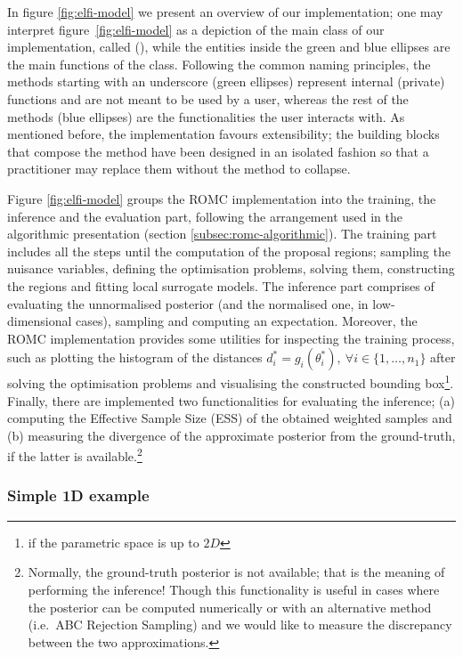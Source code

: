 In figure \ref{fig:elfi-model} we present an overview of our
implementation; one may interpret figure~\ref{fig:elfi-model} as a
depiction of the main class of our implementation, called
(), while the entities inside the green and blue
ellipses are the main functions of the class. Following the common
naming principles, the methods starting with an underscore (green
ellipses) represent internal (private) functions and are not meant to
be used by a user, whereas the rest of the methods (blue ellipses) are
the functionalities the user interacts with. As mentioned before, the
implementation favours extensibility; the building blocks that compose
the method have been designed in an isolated fashion so that a
practitioner may replace them without the method to collapse.

Figure \ref{fig:elfi-model} groups the ROMC implementation into the
training, the inference and the evaluation part, following the
arrangement used in the algorithmic presentation (section
\ref{subsec:romc-algorithmic}). The training part includes all the
steps until the computation of the proposal regions; sampling the
nuisance variables, defining the optimisation problems, solving them,
constructing the regions and fitting local surrogate models. The
inference part comprises of evaluating the unnormalised posterior (and
the normalised one, in low-dimensional cases), sampling and computing
an expectation. Moreover, the ROMC implementation provides some
utilities for inspecting the training process, such as plotting the
histogram of the distances
$d^*_i = g_i(\theta_i^*), \: \forall i \in \{1, \ldots, n_1 \}$ after
solving the optimisation problems and visualising the constructed
bounding box\footnote{if the parametric space is up to $2D$}. Finally,
there are implemented two functionalities for evaluating the
inference; (a) computing the Effective Sample Size (ESS) of the
obtained weighted samples and (b) measuring the divergence of the
approximate posterior from the ground-truth, if the latter is
available.\footnote{Normally, the ground-truth posterior is not
  available; that is the meaning of performing the inference!  Though
  this functionality is useful in cases where the posterior can be
  computed numerically or with an alternative method (i.e.\ ABC
  Rejection Sampling) and we would like to measure the discrepancy
  between the two approximations.}


\subsubsection*{Simple 1D example}


